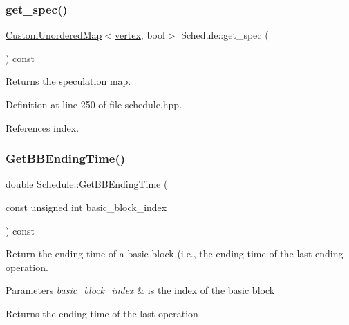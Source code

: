 \subsubsection{\texorpdfstring{get\+\_\+spec()}{get\_spec()}}
{\footnotesize\ttfamily \hyperlink{custom__map_8hpp_ad1ed68f2ff093683ab1a33522b144adc}{Custom\+Unordered\+Map}$<$\hyperlink{graph_8hpp_abefdcf0544e601805af44eca032cca14}{vertex}, bool$>$ Schedule\+::get\+\_\+spec (\begin{DoxyParamCaption}{ }\end{DoxyParamCaption}) const\hspace{0.3cm}{\ttfamily [inline]}}



Returns the speculation map. 



Definition at line 250 of file schedule.\+hpp.



References index.

\mbox{\label{classSchedule_a22d0a54d38e05ab87f86b5c898908816}} 
\subsubsection{\texorpdfstring{Get\+B\+B\+Ending\+Time()}{GetBBEndingTime()}}
{\footnotesize\ttfamily double Schedule\+::\+Get\+B\+B\+Ending\+Time (\begin{DoxyParamCaption}\item[{const unsigned int}]{basic\+\_\+block\+\_\+index }\end{DoxyParamCaption}) const\hspace{0.3cm}{\ttfamily [private]}}



Return the ending time of a basic block (i.\+e., the ending time of the last ending operation. 


\begin{DoxyParams}{Parameters}
{\em basic\+\_\+block\+\_\+index} & is the index of the basic block \\
\hline
\end{DoxyParams}
\begin{DoxyReturn}{Returns}
the ending time of the last operation 
\end{DoxyReturn}


